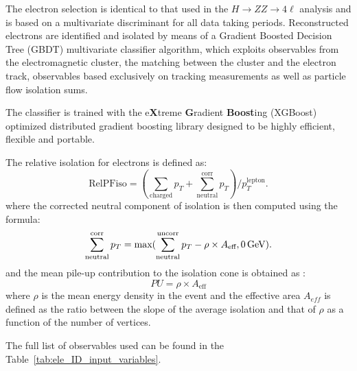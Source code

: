 The electron selection is identical to that used in the $H\rightarrow ZZ \rightarrow 4\ell$ analysis
and is based on a multivariate discriminant for all data taking periods.
Reconstructed electrons are identified and isolated by means of a Gradient Boosted Decision Tree (GBDT) multivariate classifier algorithm, which exploits observables from the electromagnetic cluster, the matching between the cluster and the electron track, observables based exclusively on tracking measurements as well as particle flow isolation sums.

The classifier is trained with the e\textbf{X}treme \textbf{G}radient \textbf{Boost}ing (XGBoost) optimized distributed gradient boosting library designed to be highly efficient, flexible and portable.

The relative isolation for electrons is defined as: 
\begin{equation}
\text{RelPFiso} = (\sum_{\text{charged}} p_T + \sum^{\text{corr}}_{\text{neutral}} p_T)/p_T^{\text{lepton}}  .
\label{eqn:elepfrelisoeqn}
\end{equation} 
where the corrected neutral component of isolation is then computed using the formula:
\begin{equation}
\label{eqn:neutralea}
  \sum^{\text{corr}}_{\text{neutral}} p_T = \text{max}(\sum^{\text{uncorr}}_{\text{neutral}} p_T - \rho \times A_\text{eff},0 \,\text{Ge\hspace{-.08em}V})  .
\end{equation}
and the mean pile-up contribution to the isolation cone is obtained as :
\begin{equation}
  PU =  \rho \times A_\text{eff}
\label{eqn:purho}
\end{equation}
where $\rho$ is the mean energy density in the event and the effective area $A_{eff}$ is defined as the ratio
between the slope of the average isolation and that of $\rho$ as a function of the number of vertices.

The full list of observables used can be found in the Table~\ref{tab:ele_ID_input_variables}.


